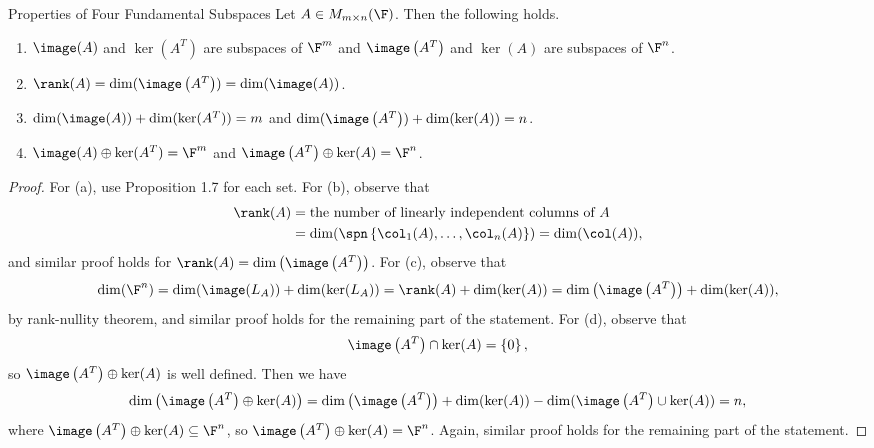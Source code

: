 \documentclass[linearalgebraI]{subfiles}
\begin{document}
    \begin{prop}{Properties of Four Fundamental Subspaces}
        Let $A\in M_{m\times n}(\F)$. Then the following holds.
        \begin{enumerate}
            \item $\image(A)$ and $\ker(A^T)$ are subspaces of $\F^m$ and $\image\left( A^{T}  \right) $ and $\ker(A)$ are subspaces of $\F^n$.
            \item $\rank(A) = \dim (\image\left( A^{T}  \right) ) = \dim (\image(A))$.
            \item $\dim (\image(A)) + \dim (\ker( A^T)) = m$ and $\dim (\image\left( A^{T}  \right) ) + \dim (\ker(A)) = n$.
            \item $\image(A) \oplus \ker(A^T) = \F^m$ and $\image\left( A^{T} \right)  \oplus \ker(A) = \F^n$.
        \end{enumerate}
    \end{prop}

    \begin{proof}
        For (a), use Proposition 1.7 for each set. For (b), observe that
        \begin{align*}
            \rank(A) & = \text{the number of linearly independent columns of }A \\
                    & = \dim (\spn \left\lbrace \col_1(A), \ldots, \col_n(A) \right\rbrace) = \dim (\col (A)),
        \end{align*} 
        and similar proof holds for $\rank(A) = \dim \left( \image\left( A^{T}  \right)  \right) $. For (c), observe that
        \begin{equation*}
            \dim (\F^n) = \dim (\image(L_A)) + \dim (\ker(L_A)) = \rank(A) + \dim (\ker (A)) = \dim \left( \image\left( A^{T} \right)  \right)  + \dim (\ker(A)),
        \end{equation*}
        by rank-nullity theorem, and similar proof holds for the remaining part of the statement. For (d), observe that
        \begin{equation*}
            \image\left( A^{T} \right)  \cap \ker(A) = \left\lbrace 0 \right\rbrace,
        \end{equation*}
        so $\image\left( A^{T} \right) \oplus \ker(A)$ is well defined. Then we have
        \begin{equation*}
            \dim \left(\image\left( A^{T}  \right)  \oplus \ker(A)\right) = \dim \left( \image\left( A^{T} \right)  \right)  + \dim (\ker(A)) - \dim (\image\left( A^{T}  \right)  \cup \ker(A)) = n,
        \end{equation*}
        where $\image\left( A^{T} \right)  \oplus \ker(A)\subseteq \F^n$, so $\image\left( A^{T} \right)  \oplus \ker(A) = \F^n$. Again, similar proof holds for the remaining part of the statement.
    \end{proof}
\end{document}
